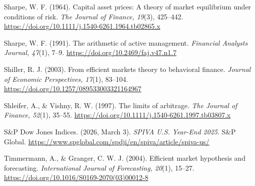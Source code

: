 \documentclass[11pt,a4paper]{article}
\begin{document}
\begin{fshfreferences}
\item Sharpe, W. F. (1964). Capital asset prices: A theory of market equilibrium under conditions of risk. \textit{The Journal of Finance, 19}(3), 425--442. \url{https://doi.org/10.1111/j.1540-6261.1964.tb02865.x}

\item Sharpe, W. F. (1991). The arithmetic of active management. \textit{Financial Analysts Journal, 47}(1), 7--9. \url{https://doi.org/10.2469/faj.v47.n1.7}

\item Shiller, R. J. (2003). From efficient markets theory to behavioral finance. \textit{Journal of Economic Perspectives, 17}(1), 83--104. \url{https://doi.org/10.1257/089533003321164967}

\item Shleifer, A., \& Vishny, R. W. (1997). The limits of arbitrage. \textit{The Journal of Finance, 52}(1), 35--55. \url{https://doi.org/10.1111/j.1540-6261.1997.tb03807.x}

\item S\&P Dow Jones Indices. (2026, March 3). \textit{SPIVA U.S. Year-End 2025}. S\&P Global. \url{https://www.spglobal.com/spdji/en/spiva/article/spiva-us/}

\item Timmermann, A., \& Granger, C. W. J. (2004). Efficient market hypothesis and forecasting. \textit{International Journal of Forecasting, 20}(1), 15--27. \url{https://doi.org/10.1016/S0169-2070(03)00012-8}

\end{fshfreferences}

\end{document}
